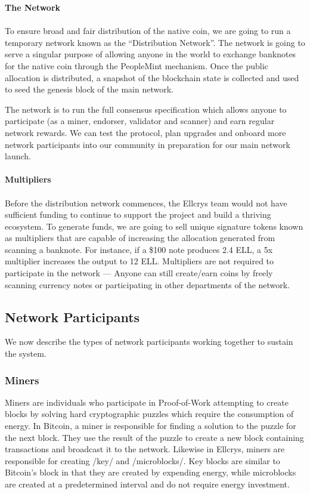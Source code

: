 \noindent
\textbf{The Network} \\\\
To ensure broad and fair distribution of the native coin, we are going to run a temporary network known as the “Distribution Network”. The network is going to serve a singular purpose of allowing anyone in the world to exchange banknotes for the native coin through the PeopleMint mechanism. Once the public allocation is distributed, a snapshot of the blockchain state is collected and used to seed the genesis block of the main network.

The network is to run the full consensus specification which allows anyone to participate (as a miner, endorser, validator and scanner) and earn regular network rewards. We can test the protocol, plan upgrades and onboard more network participants into our community in preparation for our main network launch. \\\\

\noindent
\textbf{Multipliers}\\\\
Before the distribution network commences, the Ellcrys team would not have sufficient funding to continue to support the project and build a thriving ecosystem. To generate funds, we are going to sell unique signature tokens known as multipliers that are capable of increasing the allocation generated from scanning a banknote. For instance, if a \$100 note produces 2.4 ELL, a 5x multiplier increases the output to 12 ELL. Multipliers are not required to participate in the network — Anyone can still create/earn coins by freely scanning currency notes or participating in other departments of the network.


\subsection{Network Participants}
We now describe the types of network participants working together to sustain the system.

\subsubsection{Miners}
Miners are individuals who participate in Proof-of-Work attempting to create blocks by solving hard cryptographic puzzles which require the consumption of energy. In Bitcoin, a miner is responsible for finding a solution to the puzzle for the next block. They use the result of the puzzle to create a new block containing transactions and broadcast it to the network. Likewise in Ellcrys, miners are responsible for creating /key/ and /microblocks/. Key blocks are similar to Bitcoin’s block in that they are created by expending energy, while microblocks are created at a predetermined interval and do not require energy investment.

